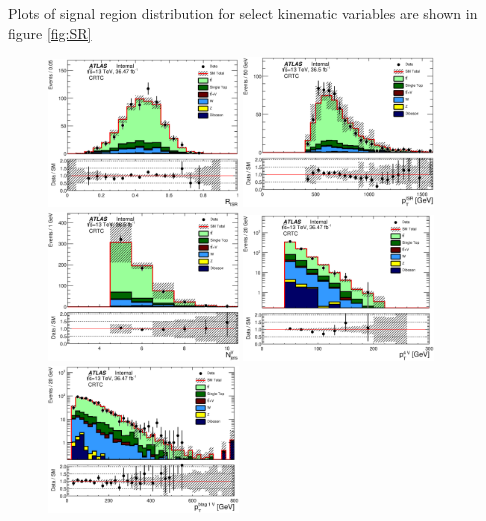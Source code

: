 \indent Plots of signal region distribution for select kinematic variables are shown in figure \ref{fig:SR}

\begin{figure}[htbp]
  \begin{center}
    \includegraphics[width=0.45\textwidth]{figures/ttbar/postfit/CA_RISR_CRTopC}
    \includegraphics[width=0.45\textwidth]{figures/ttbar/postfit/CA_pTISR_CRTopC}
    \includegraphics[width=0.45\textwidth]{figures/ttbar/postfit/CA_NjV_CRTopC}
    \includegraphics[width=0.45\textwidth]{figures/ttbar/postfit/CA_pTjV4_CRTopC_log}
    \includegraphics[width=0.45\textwidth]{figures/ttbar/postfit/CA_pTbV1_CRTopC_log}

\end{center}
\end{figure}
